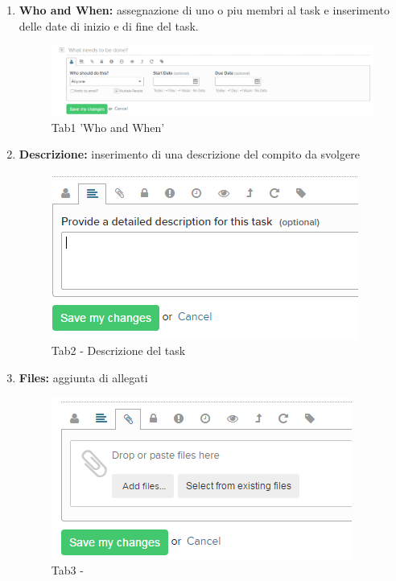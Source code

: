 \documentclass[a4paper,11pt]{article}
\begin{document}
		\begin{enumerate}
		\item \textbf{Who and When:} assegnazione di uno o piu membri al task e inserimento delle date di inizio e di fine del task. 
			\begin{figure}[H]
			\centering
			\includegraphics[scale=0.50]{../images/teamwork_task1.png}
			\caption{ Tab1 'Who and When' }
			\end{figure}
		
		\item \textbf{Descrizione:} inserimento di una descrizione del compito da svolgere  
			\begin{figure}[H]
			\centering
			\includegraphics[scale=0.50]{../images/teamwork_task2.png}
			\caption{ Tab2 - Descrizione del task }	
			\end{figure}
		
		\item \textbf{Files:} aggiunta di allegati
			\begin{figure}[H]
			\centering
			\includegraphics[scale=0.50]{../images/teamwork_task3.png}
			\caption{ Tab3 -  }
			\end{figure}
		

\end{enumerate}
\end{document}
